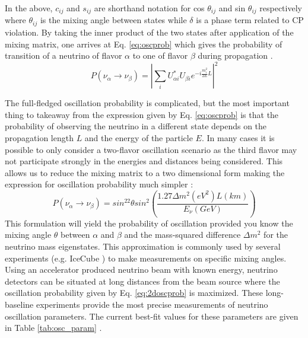 \documentclass{gatech-thesis}
\begin{document}
In the above, $c_{ij}$ and $s_{ij}$ are shorthand notation for cos $ \theta_{ij}$ and sin $\theta_{ij}$ respectively where $\theta_{ij}$ is the mixing angle between states while $\delta$ is a phase term related to CP violation. By taking the inner product of the two states after application of the mixing matrix, one arrives at Eq. \ref{eq:oscprob} which gives the probability of transition of a neutrino of flavor $\alpha$ to one of flavor $\beta$ during propagation \cite{2008PrPNP..60..338N}.
\begin{equation}\label{eq:oscprob}
P(\nu_{\alpha}\rightarrow \nu_{\beta}) = \left| \sum_{i} U_{\alpha i}^* U_{\beta i} e^{-i\frac{m_{i}^2}{2E}L}\right| ^2
\end{equation}

The full-fledged oscillation probability is complicated, but the most important thing to takeaway from the expression given by Eq. \ref{eq:oscprob} is that the probability of observing the neutrino in a different state depends on the propagation length $L$ and the energy of the particle $E$. In many cases it is possible to only consider a two-flavor oscillation scenario as the third flavor may not participate strongly in the energies and distances being considered. This allows us to reduce the mixing matrix to a two dimensional form making the expression for oscillation probability much simpler \cite{1998PhRvL..81.1562F}:
\begin{equation}\label{eq:2doscprob}
P(\nu_{\alpha}\rightarrow \nu_{\beta}) = sin^22\theta sin^2\left(\frac{1.27\Delta m^2 (eV^2) L (km)}{E_\nu (GeV)}\right)
\end{equation}
This formulation will yield the probability of oscillation provided you know the mixing angle $\theta$ between $\alpha$ and $\beta$ and the mass-squared difference $\Delta m^2$ for the neutrino mass eigenstates. This approximation is commonly used by several experiments (e.g. IceCube \cite{2013PhRvL.111h1801A}) to make measurements on specific mixing angles. Using an accelerator produced neutrino beam with known energy, neutrino detectors can be situated at long distances from the beam source where the oscillation probability given by Eq. \ref{eq:2doscprob} is maximized. These long-baseline experiments provide the most precise measurements of neutrino oscillation parameters. The current best-fit values for these parameters are given in Table \ref{tab:osc_param} \cite{PhysRevD.89.093018}.
\end{document}
